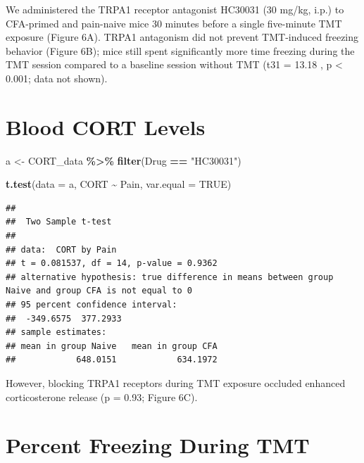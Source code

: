 \documentclass[
]{book}
\newenvironment{Shaded}{\begin{snugshade}}{\end{snugshade}}
\newcommand{\AttributeTok}[1]{\textcolor[rgb]{0.13,0.29,0.53}{#1}}
\newcommand{\ConstantTok}[1]{\textcolor[rgb]{0.56,0.35,0.01}{#1}}
\newcommand{\FunctionTok}[1]{\textcolor[rgb]{0.13,0.29,0.53}{\textbf{#1}}}
\newcommand{\NormalTok}[1]{#1}
\newcommand{\OtherTok}[1]{\textcolor[rgb]{0.56,0.35,0.01}{#1}}
\newcommand{\SpecialCharTok}[1]{\textcolor[rgb]{0.81,0.36,0.00}{\textbf{#1}}}
\newcommand{\StringTok}[1]{\textcolor[rgb]{0.31,0.60,0.02}{#1}}
\begin{document}
We administered the TRPA1 receptor antagonist HC30031 (30 mg/kg, i.p.) to CFA-primed and pain-naive mice 30 minutes before a single five-minute TMT exposure (Figure 6A). TRPA1 antagonism did not prevent TMT-induced freezing behavior (Figure 6B); mice still spent significantly more time freezing during the TMT session compared to a baseline session without TMT (t31 = 13.18 , p \textless{} 0.001; data not shown).

\section*{Blood CORT Levels}\label{blood-cort-levels}

\begin{Shaded}
\begin{Highlighting}[]
\NormalTok{a }\OtherTok{\textless{}{-}}\NormalTok{ CORT\_data }\SpecialCharTok{\%\textgreater{}\%}
  \FunctionTok{filter}\NormalTok{(Drug }\SpecialCharTok{==} \StringTok{"HC30031"}\NormalTok{) }

\FunctionTok{t.test}\NormalTok{(}\AttributeTok{data =}\NormalTok{ a, CORT }\SpecialCharTok{\textasciitilde{}}\NormalTok{ Pain, }\AttributeTok{var.equal =} \ConstantTok{TRUE}\NormalTok{)}
\end{Highlighting}
\end{Shaded}

\begin{verbatim}
## 
##  Two Sample t-test
## 
## data:  CORT by Pain
## t = 0.081537, df = 14, p-value = 0.9362
## alternative hypothesis: true difference in means between group Naive and group CFA is not equal to 0
## 95 percent confidence interval:
##  -349.6575  377.2933
## sample estimates:
## mean in group Naive   mean in group CFA 
##            648.0151            634.1972
\end{verbatim}

However, blocking TRPA1 receptors during TMT exposure occluded enhanced corticosterone release (p = 0.93; Figure 6C).

\section*{Percent Freezing During TMT}\label{percent-freezing-during-tmt}
\end{document}
